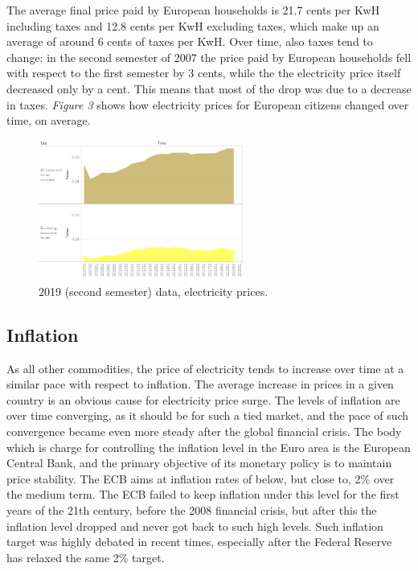 \documentclass{book}
\begin{document}
The average final price paid by European households is 21.7 cents per KwH including taxes and 12.8 cents per KwH excluding taxes, which make up an average of around 6 cents of taxes per KwH. Over time, also taxes tend to change: in the second semester of 2007 the price paid by European households fell with respect to the first semester by 3 cents, while the the electricity price itself decreased only by a cent. This means that most of the drop was due to a decrease in taxes. \textit{Figure 3} shows how electricity prices for European citizens changed over time, on average.

\bigskip
\begin{figure}[H]
\begin{center}
\captionsetup{justification=centering}
\includegraphics[width=0.6\textwidth]{Images/TaxesTime.png}
\caption{2019 (second semester) data, electricity prices. }
\end{center}
\end{figure}
\bigskip

\subsection*{Inflation}

As all other commodities, the price of electricity tends to increase over time at a similar pace with respect to inflation. The average increase in prices in a given country is an obvious cause for electricity price surge. The levels of inflation are over time converging, as it should be for such a tied market, and the pace of such convergence became even more steady after the global financial crisis. \cite{brovz2018dynamics} The body which is charge for controlling the inflation level in the Euro area is the European Central Bank, and the primary objective of its monetary policy is to maintain price stability. The ECB aims at inflation rates of below, but close to, 2\% over the medium term. The ECB failed to keep inflation under this level for the first years of the 21th century, before the 2008 financial crisis, but after this the inflation level dropped and never got back to such high levels. Such inflation target was highly debated in recent times, especially after the Federal Reserve has relaxed the same 2\% target.\\
\end{document}
